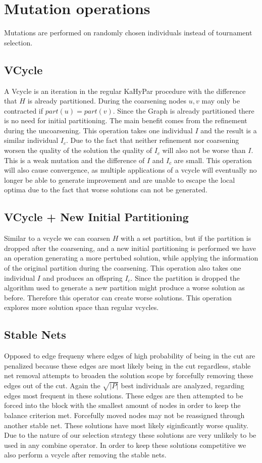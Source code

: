 \documentclass[a4paper,12pt,bibtotoc,titlepage, liststotoc,BCOR7mm,headsepline,pointlessnumbers]{scrbook}
\numberwithin{equation}{section}
\begin{document}
\section{Mutation operations}
Mutations are performed on randomly chosen individuals instead of tournament selection.
\subsection{VCycle}
A Vcycle is an iteration in the regular KaHyPar procedure with the difference that $H$ is already partitioned. During the coarsening nodes $u,v$ may only be contracted if $part(u) = part(v)$. Since the Graph is already partitioned there is no need for initial partitioning. The main benefit comes from the refinement during the uncoarsening. This operation takes one individual $I$ and the result is a similar individual $I_c$. Due to the fact that neither refinement nor coarsening worsen the quality of the solution the quality of $I_c$ will also not be worse than $I$. This is a weak mutation and the difference of $I$ and $I_c$ are small. This operation will also cause convergence, as multiple applications of a vcycle will eventually no longer be able to generate improvement and are unable to escape the local optima due to the fact that worse solutions can not be generated.   
\subsection{VCycle + New Initial Partitioning}
Similar to a vcycle we can coarsen $H$ with a set partition, but if the partition is dropped after the coarsening, and a new initial partitioning is performed we have an operation generating a more pertubed solution, while applying the information of the original partition during the coarsening. This operation also takes one individual $I$ and produces an offspring $I_c$. Since the partition is
dropped the algorithm used to generate a new partition might produce a worse solution as before. Therefore this operator can create worse solutions. This operation explores more solution space than regular vcycles.  
\subsection{Stable Nets}
Opposed to edge frequeny where edges of high probability of being in the cut are penalized because these edges are most likely being in the cut regardless, stable net removal attempts to broaden the solution scope by forcefully removing these edges out of the cut. Again the $\sqrt{|P|}$ best individuals are analyzed, regarding edges most frequent in these solutions. These edges are then attempted to be forced into the block with the smallest amount of nodes in order to keep the balance criterion met. Forcefully moved nodes may not be reassigned through another stable net. These solutions have most likely siginficantly worse quality. Due to the nature of our selection strategy these solutions are very unlikely to be used in any combine operator. In order to keep these solutions competitive we also perform a vcycle after removing the stable nets. 
\end{document}
